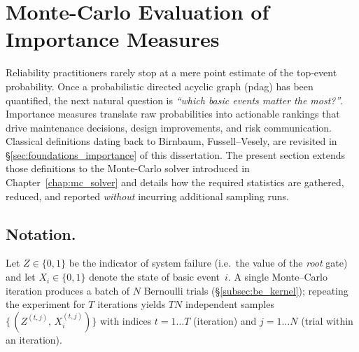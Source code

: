 \chapter{Monte-Carlo Evaluation of Importance Measures}
\label{sec:mc_importance_measures}

Reliability practitioners rarely stop at a mere point estimate of the top‐event
probability.  Once a probabilistic directed acyclic graph (\acrshort{pdag}) has
been quantified, the next natural question is 
\emph{``which basic events matter the most?''}.  Importance measures translate
raw probabilities into actionable rankings that drive maintenance decisions,
design improvements, and risk communication.  Classical definitions dating back
to Birnbaum, Fussell--Vesely, are revisited in
\S\ref{sec:foundations_importance} of this dissertation.  The present section
extends those definitions to the Monte-Carlo solver introduced in
Chapter~\ref{chap:mc_solver} and details how the required statistics are
gathered, reduced, and reported \emph{without} incurring additional sampling
runs.

\section*{Notation.}  Let $Z\in\{0,1\}$ be the indicator of system failure
(i.e.~the value of the \emph{root} gate) and let $X_i\in\{0,1\}$ denote the
state of basic event~$i$.
A single Monte–Carlo iteration produces a batch of $N$ Bernoulli trials
(\S\ref{subsec:be_kernel}); repeating the experiment for $T$ iterations yields
$T N$ 
independent samples $\bigl\{\,(Z^{(t,j)},\,X_i^{(t,j)})\bigr\}$ with indices
$t\!=\!1\dots T$ (iteration) and $j\!=\!1\dots N$ (trial within an
iteration).

